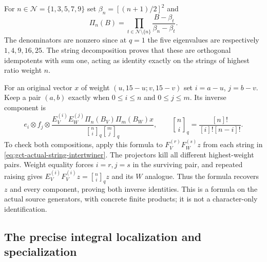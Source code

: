For $n\in\mathcal N=\{1,3,5,7,9\}$ set
$\beta_n=[(n+1)/2]^2$ and
\begin{equation}
 \Pi_n(B)=\prod_{t\in\mathcal N\setminus\{n\}}
 \frac{B-\beta_t}{\beta_n-\beta_t}.
 \label{eq:gct-source-isotypic-projector}
\end{equation}
The denominators are nonzero since at $q=1$ the five eigenvalues
are respectively $1,4,9,16,25$. The string decomposition proves
that these are orthogonal idempotents with sum one, acting as
identity exactly on the strings of highest ratio weight $n$.

For an original vector $x$ of weight $(u,15-u;v,15-v)$ set
$i=a-u$, $j=b-v$. Keep a pair $(a,b)$ exactly when
$0\leq i\leq n$ and $0\leq j\leq m$. Its inverse component is
\begin{equation}
 e_i\otimes f_j\otimes
 \frac{E_V^{(i)}E_W^{(j)}
       \Pi_n(B_V)\Pi_m(B_W)x}
 {\displaystyle \genfrac{[}{]}{0pt}{}{n}{i}_q
                   \genfrac{[}{]}{0pt}{}{m}{j}_q},
 \qquad \genfrac{[}{]}{0pt}{}{n}{i}_q=\frac{[n]!}{[i]![n-i]!}.
 \label{eq:gct-source-intertwiner-inverse}
\end{equation}
To check both compositions, apply this formula to
$F_V^{(r)}F_W^{(s)}z$ from each string in
\eqref{eq:gct-actual-string-intertwiner}. The projectors kill all
different highest-weight pairs. Weight equality forces $i=r,j=s$
in the surviving pair, and repeated raising gives
$E_V^{(i)}F_V^{(i)}z=\genfrac{[}{]}{0pt}{}{n}{i}_qz$ and its $W$ analogue.
Thus the formula recovers $z$ and every component, proving both
inverse identities. This is a formula on the actual source
generators, with concrete finite products; it is not a character-only
identification.

\subsection{The precise integral localization and specialization}

